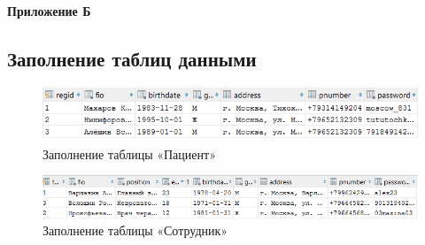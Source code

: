 \documentclass[14pt,a4paper,russian]{extreport}
\begin{document}














\newpage
\hfill\textbf{Приложение Б}
\setcounter{figure}{0}

\subsection*{Заполнение таблиц данными}
\setlength{\textfloatsep}{2pt}
\begin{figure}[h!]
        \center\includegraphics[scale=1]{patient}
        \caption{Заполнение таблицы «Пациент»}
        \label{fig:patient}
\end{figure}

\vspace{0.00mm}

\begin{figure}[h!]
        \center\includegraphics[scale=0.83]{employee}
        \caption{Заполнение таблицы «Сотрудник»}
        \label{fig:employee}
\end{figure}
\end{document}
